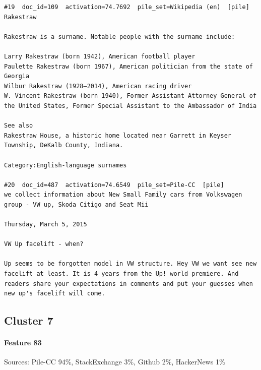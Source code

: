 \begin{verbatim}
#19  doc_id=109  activation=74.7692  pile_set=Wikipedia (en)  [pile]
Rakestraw

Rakestraw is a surname. Notable people with the surname include:

Larry Rakestraw (born 1942), American football player
Paulette Rakestraw (born 1967), American politician from the state of Georgia
Wilbur Rakestraw (1928–2014), American racing driver
W. Vincent Rakestraw (born 1940), Former Assistant Attorney General of the United States, Former Special Assistant to the Ambassador of India

See also
Rakestraw House, a historic home located near Garrett in Keyser Township, DeKalb County, Indiana.

Category:English-language surnames

#20  doc_id=487  activation=74.6549  pile_set=Pile-CC  [pile]
we collect information about New Small Family cars from Volkswagen group - VW up, Skoda Citigo and Seat Mii

Thursday, March 5, 2015

VW Up facelift - when?

Up seems to be forgotten model in VW structure. Hey VW we want see new facelift at least. It is 4 years from the Up! world premiere. And readers share your expectations in comments and put your guesses when new up's facelift will come.

\end{verbatim}

\subsection*{Cluster 7}

\paragraph*{Feature 83} Sources: Pile-CC 94\%, StackExchange 3\%, Github 2\%, HackerNews 1\%


